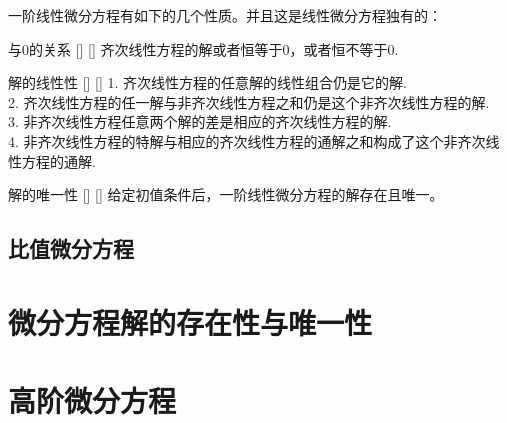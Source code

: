 \documentclass[UTF8]{ctexart}
\begin{document}
        一阶线性微分方程有如下的几个性质。并且这是线性微分方程独有的：
        \begin{ppt}
            []
            {与0的关系}
            []
            []
            齐次线性方程的解或者恒等于0，或者恒不等于0.
        \end{ppt}
        \begin{ppt}
            []
            {解的线性性}
            []
            []
            1. 齐次线性方程的任意解的线性组合仍是它的解.\\
            2. 齐次线性方程的任一解与非齐次线性方程之和仍是这个非齐次线性方程的解.\\
            3. 非齐次线性方程任意两个解的差是相应的齐次线性方程的解.\\
            4. 非齐次线性方程的特解与相应的齐次线性方程的通解之和构成了这个非齐次线性方程的通解.
        \end{ppt}

        \begin{ppt}
            []
            {解的唯一性}
            []
            []
            给定初值条件后，一阶线性微分方程的解存在且唯一。
        \end{ppt}

    \subsection{比值微分方程}

\section{微分方程解的存在性与唯一性}

\section{高阶微分方程}
\end{document}
